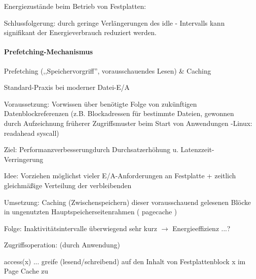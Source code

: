 \documentclass[a4paper]{article}
\begin{document}
\begin{multicols}{3}
    Energiezustände beim Betrieb von Festplatten:

    \begin{itemize*}
        \item
        \item
        Schlussfolgerung: durch geringe Verlängerungen des idle - Intervalls
        kann signifikant der Energieverbrauch reduziert werden.
    \end{itemize*}


    \paragraph{Prefetching-Mechanismus}

    \begin{itemize*}
        \item
        Prefetching (,,Speichervorgriff'', vorausschauendes Lesen) \& Caching
        \begin{itemize*}
            \item Standard-Praxis bei moderner Datei-E/A
            \item Voraussetzung: Vorwissen über benötigte Folge von zukünftigen Datenblockreferenzen (z.B. Blockadressen für bestimmte Dateien, gewonnen durch Aufzeichnung früherer Zugriffsmuster beim Start von Anwendungen -Linux: readahead syscall)
            \item Ziel: Performanzverbesserungdurch Durchsatzerhöhung u. Latenzzeit-Verringerung
            \item Idee: Vorziehen möglichst vieler E/A-Anforderungen an Festplatte + zeitlich gleichmäßige Verteilung der verbleibenden
            \item Umsetzung: Caching (Zwischenspeichern) dieser vorausschauend gelesenen Blöcke in ungenutzten Hauptspeicherseitenrahmen ( pagecache )
        \end{itemize*}
        \item
        Folge: Inaktivitätsintervalle überwiegend sehr kurz
        $\rightarrow$ Energieeffizienz ...?
        \item
        Zugriffsoperation: (durch Anwendung)
        \begin{itemize*}
            \item access(x) ... greife (lesend/schreibend) auf den Inhalt von Festplattenblock x im Page Cache zu
        \end{itemize*}
        \item

\end{itemize*}
\end{multicols}
\end{document}
